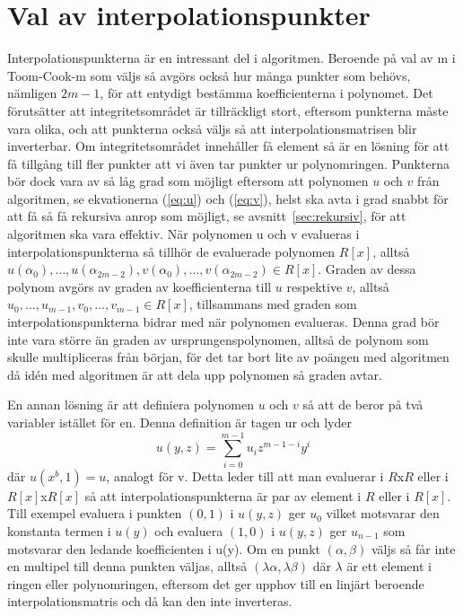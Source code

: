 \section{Val av interpolationspunkter}
Interpolationspunkterna är en intressant del i algoritmen. Beroende på val av m
i Toom-Cook-m som väljs så avgörs också hur många punkter som behövs, nämligen
$2m-1$, för att entydigt bestämma koefficienterna i polynomet. Det förutsätter
att integritetsområdet är tillräckligt stort, eftersom punkterna måste vara
olika, och att punkterna också väljs så att interpolationsmatrisen blir
inverterbar. Om integritetsområdet innehåller få element så är en lösning för
att få tillgång till fler punkter att vi även tar punkter ur polynomringen.
Punkterna bör dock vara av så låg grad som möjligt eftersom att polynomen $u$ och
$v$ från algoritmen, se ekvationerna (\ref {eq:u}) och (\ref{eq:v}), helst ska
avta i grad snabbt för att få så få rekursiva anrop som möjligt, se
avsnitt~\ref{sec:rekursiv}, för att algoritmen ska vara effektiv. När polynomen
u och v evalueras i interpolationspunkterna så tillhör de evaluerade polynomen
$R[x]$, alltså
$u(\alpha_0),\dots,u(\alpha_{2m-2}),v(\alpha_0),\dots,v(\alpha_{2m-2}) \in
R[x]$. Graden av dessa polynom avgörs av graden av koefficienterna till $u$
respektive $v$, alltså $u_0,\dots,u_{m-1},v_0,\dots,v_{m-1} \in R[x]$,
tillsammans med graden som interpolationspunkterna bidrar med när polynomen
evalueras. Denna grad bör inte vara större än graden av ursprungenspolynomen,
alltså de polynom som skulle multipliceras från början, för det tar bort lite
av poängen med algoritmen då idén med algoritmen är att dela upp polynomen så
graden avtar.

En annan lösning är att definiera polynomen $u$ och $v$ så att de beror på två
variabler istället för en. Denna definition är tagen ur \cite{bodrato2007notes}
och lyder
\begin{equation*}
  u(y,z) = \sum\limits_{i=0}^{m-1} {u_iz^{m-1-i}y^i}
\end{equation*}
där $u(x^b,1) = u$, analogt för v. Detta leder till att man evaluerar i $R$x$R$
eller i $R[x]$x$R[x]$ så att interpolationspunkterna är par av element i $R$
eller i $R[x]$. Till exempel evaluera i punkten $(0,1)$ i $u(y,z)$ ger $u_0$
vilket motsvarar den konstanta termen i $u(y)$ och evaluera $(1,0)$ i $u(y,z)$
ger $u_{n-1}$ som motsvarar den ledande koefficienten i u(y). Om en punkt
$(\alpha,\beta)$ väljs så får inte en multipel till denna punkten väljas,
alltså $(\lambda\alpha,\lambda\beta)$ där $\lambda$ är ett element i ringen
eller polynomringen, eftersom det ger upphov till en linjärt beroende
interpolationsmatris och då kan den inte inverteras.
